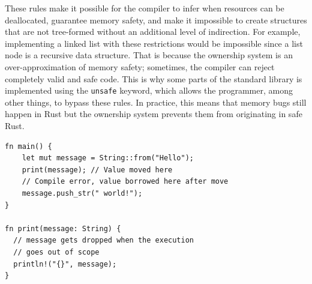 \documentclass[paper=a4,%
  twoside,%
  BCOR4mm,%
  abstract=true,%
  toc=bibliography,%
  chapterprefix=true,%
  toc=bibliographynumbered,%
  open=right,%
  english,%
  pagesize=pdftex]{scrreprt}
\begin{document}
These rules make it possible for the compiler to infer when resources can be deallocated, guarantee memory safety, and make it impossible to create structures that are not tree-formed without an additional level of indirection. For example, implementing a linked list with these restrictions would be impossible since a list node is a recursive data structure. That is because the ownership system is an over-approximation of memory safety; sometimes, the compiler can reject completely valid and safe code. This is why some parts of the standard library is implemented using the \texttt{unsafe} keyword, which allows the programmer, among other things, to bypass these rules. In practice, this means that memory bugs still happen in Rust but the ownership system prevents them from originating in safe Rust.

\begin{lstlisting}[style=boxed, caption={Transferring the ownership to a method}, label=lst:ownership-method-call]
fn main() {
    let mut message = String::from("Hello");
    print(message); // Value moved here
    // Compile error, value borrowed here after move
    message.push_str(" world!");
}

fn print(message: String) {
  // message gets dropped when the execution
  // goes out of scope
  println!("{}", message);
}
\end{lstlisting}

\end{document}
